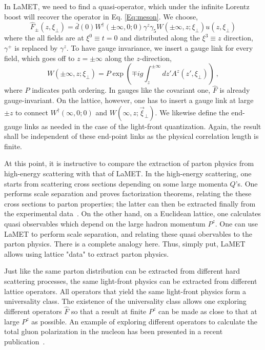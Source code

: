 \documentclass[aps,prd,preprint,tightenlines,superscriptaddress]{revtex4}
\begin{document}
In LaMET, we need to find a quasi-operator, which under the infinite Lorentz boost will recover
the operator in Eq. \ref{Eq:meson}. We choose, 
\begin{equation}
      \hat F_\pm(z, \xi_\perp) = \bar d (0)W^\dagger(\pm\infty,0;0) \gamma^z\gamma_5 W(\pm\infty,z;\xi_\perp)u(z,\xi_\perp)
\end{equation}
where the all fields are at $\xi^0\equiv t = 0$ and distributed along the $\xi^3\equiv z$ direction, $\gamma^+$ is replaced by
$\gamma^z$. To have gauge invariance, we insert a gauge link for every field, which
goes off to $z=\pm \infty$ along the $z$-direction,
\begin{equation}
        W(\pm\infty, z; \xi_\perp) = P\exp\left(\mp ig\int^{\pm\infty}_z dz'A^z(z', \xi_\perp)\right) \ , 
\end{equation}
where $P$ indicates path ordering. 
In gauges like the covariant one, $\hat F$ is already gauge-invariant. On the lattice, however,
one has to insert a gauge link at large $\pm z$ to connect $W^\dagger(\infty,0;0)$
and $W(\infty,z;\vec{\xi}_\perp)$. We likewise define the end-gauge links as needed in the case
of the light-front quantization. Again, the result shall be independent of these end-point links 
as the physical correlation length is finite. 

At this point, it is instructive to compare the extraction of parton physics from high-energy scattering
with that of LaMET. In the high-energy scattering, one starts from scattering cross sections depending on
some large momenta $Q$'s. One performs scale separation and proves factorization theorems, relating the
these cross sections to parton properties; the latter can then be extracted finally from the
experimental data~\cite{Gao:2013xoa}. On the other hand, on a Euclidean lattice, one calculates quasi
observables which depend on the large hadron momentum $P^z$. One can use LaMET to perform scale separation,
and relating these quasi obervables to the parton physics. There is a complete analogy here.
Thus, simply put, LaMET allows using lattice "data" to extract parton physics.

Just like the same parton distribution can be extracted from different hard scattering processes, the same
light-front physics can be extracted from different lattice operators. All operators that yield the same light-front
physics form a universality class. The existence of the universality class allows one
exploring different operators $\hat F$ so that a result at finite $P^z$ can be made as close to that at large
$P^z$ as possible. An example of exploring different operators to calculate the total gluon polarization
in the nucleon has been presented in a recent publication~\cite{Hatta:2013gta}.
\end{document}

